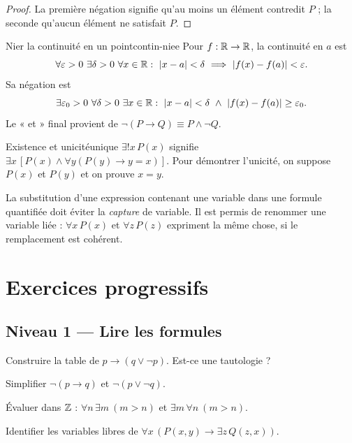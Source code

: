 \begin{proof}La première négation signifie qu'au moins un élément contredit $P$ ; la seconde qu'aucun élément ne satisfait $P$.\end{proof}
\begin{exemple}{Nier la continuité en un point}{contin-niee}
Pour $f:\mathbb R\to\mathbb R$, la continuité en $a$ est
\[\forall\varepsilon>0\ \exists\delta>0\ \forall x\in\R:\ |x-a|<\delta\ \Longrightarrow\ |f(x)-f(a)|<\varepsilon.\]
Sa négation est
\[\exists\varepsilon_0>0\ \forall\delta>0\ \exists x\in\R:\ |x-a|<\delta\ \wedge\ |f(x)-f(a)|\ge\varepsilon_0.\]
Le « et » final provient de $\neg(P\to Q)\equiv P\wedge\neg Q$.
\end{exemple}
\begin{definition}{Existence et unicité}{unique}
$\exists!x\,P(x)$ signifie $\exists x\,[P(x)\wedge\forall y(P(y)\to y=x)]$. Pour démontrer l'unicité, on suppose $P(x)$ et $P(y)$ et on prouve $x=y$.
\end{definition}
\begin{attention}
La substitution d'une expression contenant une variable dans une formule quantifiée doit éviter la \emph{capture} de variable. Il est permis de renommer une variable liée : $\forall x\,P(x)$ et $\forall z\,P(z)$ expriment la même chose, si le remplacement est cohérent.
\end{attention}

\section{Exercices progressifs}
\subsection*{Niveau 1 — Lire les formules}
\begin{exercice}\label{ex:prop:1}Construire la table de $p\to(q\vee\neg p)$. Est-ce une tautologie ?\end{exercice}
\begin{exercice}[Négations]\label{ex:prop:2}Simplifier $\neg(p\to q)$ et $\neg(p\vee\neg q)$.\end{exercice}
\begin{exercice}[Quantificateurs]\label{ex:prop:3}Évaluer dans $\mathbb Z$ : $\forall n\,\exists m\ (m>n)$ et $\exists m\,\forall n\ (m>n)$.\end{exercice}
\begin{exercice}\label{ex:prop:4}Identifier les variables libres de $\forall x\,(P(x,y)\to\exists z\,Q(z,x))$.\end{exercice}
